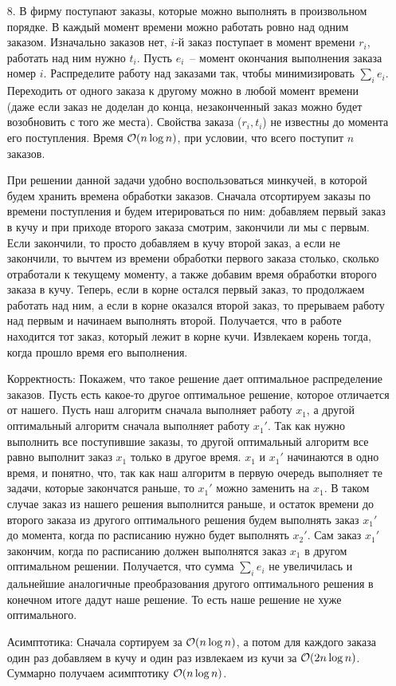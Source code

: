 \begin{enumerate}
  \item[8.]
    В фирму поступают заказы, которые можно выполнять в произвольном
    порядке. В каждый момент времени можно работать ровно над одним
    заказом.  Изначально заказов нет, $i$-й заказ поступает в момент
    времени $r_i$, работать над ним нужно $t_i$. Пусть $e_i$~-- момент
    окончания выполнения заказа номер $i$. Распределите работу над
    заказами так, чтобы минимизировать $\sum_i e_i$. Переходить от
    одного заказа к другому можно в любой момент времени (даже если
    заказ не доделан до конца, незаконченный заказ можно будет 
    возобновить с того же места). 
    Свойства заказа ($r_i, t_i$) не известны до
    момента его поступления. Время $\mathcal{O}(n \log n)$, при условии, что
    всего поступит $n$ заказов.
    \begin{solution}
        При решении данной задачи удобно воспользоваться минкучей, в которой будем хранить времена обработки заказов. Сначала отсортируем заказы по времени поступления и будем итерироваться по ним: добавляем первый заказ в кучу и при приходе второго заказа смотрим, закончили ли мы с первым. Если закончили, то просто добавляем в кучу второй заказ, а если не закончили, то вычтем из времени обработки первого заказа столько, сколько отработали к текущему моменту, а также добавим время обработки второго заказа в кучу. Теперь, если в корне остался первый заказ, то продолжаем работать над ним, а если в корне оказался второй заказ, то прерываем работу над первым и начинаем выполнять второй. Получается, что в работе находится тот заказ, который лежит в корне кучи. Извлекаем корень тогда, когда прошло время его выполнения.

        Корректность:
        Покажем, что такое решение дает оптимальное распределение заказов. Пусть есть какое-то другое оптимальное решение, которое отличается от нашего. Пусть наш алгоритм сначала выполняет работу $x_1$, а другой оптимальный алгоритм сначала выполняет работу $x_1'$. Так как нужно выполнить все поступившие заказы, то другой оптимальный алгоритм все равно выполнит заказ $x_1$ только в другое время. $x_1$ и $x_1'$ начинаются в одно время, и понятно, что, так как наш алгоритм в первую очередь выполняет те задачи, которые закончатся раньше, то $x_1'$ можно заменить на $x_1$. В таком случае заказ из нашего решения выполнится раньше, и остаток времени до второго заказа из другого оптимального решения будем выполнять заказ $x_1'$ до момента, когда по расписанию
        нужно будет выполнять $x_2'$. Сам заказ $x_1'$ закончим, когда по расписанию должен выполнятся заказ $x_1$ в другом оптимальном решении. Получается, что сумма $\sum_i e_i$ не увеличилась и дальнейшие аналогичные преобразования другого оптимального решения в конечном итоге дадут наше решение. То есть наше решение не хуже оптимального.

        Асимптотика:
        Сначала сортируем за $\mathcal{O}(n \log n)$, а потом для каждого заказа один раз добавляем в кучу и один раз извлекаем из кучи за $\mathcal{O}(2n \log n)$. Суммарно получаем асимптотику $\mathcal{O}(n \log n)$.
    \end{solution}
\end{enumerate}
    
